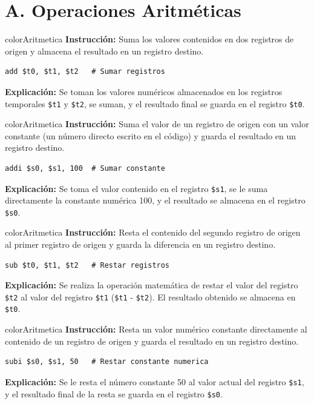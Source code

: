 \documentclass[12pt,a4paper]{article}
\begin{document}
\section*{\textcolor{colorAritmetica}{A. Operaciones Aritméticas}}

\begin{instructionBox}{colorAritmetica}
\textbf{Instrucción:} Suma los valores contenidos en dos registros de origen y almacena el resultado en un registro destino.
\begin{lstlisting}
add $t0, $t1, $t2   # Sumar registros
\end{lstlisting}
\textbf{Explicación:} Se toman los valores numéricos almacenados en los registros temporales \texttt{\$t1} y \texttt{\$t2}, se suman, y el resultado final se guarda en el registro \texttt{\$t0}.
\end{instructionBox}

\begin{instructionBox}{colorAritmetica}
\textbf{Instrucción:} Suma el valor de un registro de origen con un valor constante (un número directo escrito en el código) y guarda el resultado en un registro destino.
\begin{lstlisting}
addi $s0, $s1, 100  # Sumar constante
\end{lstlisting}
\textbf{Explicación:} Se toma el valor contenido en el registro \texttt{\$s1}, se le suma directamente la constante numérica 100, y el resultado se almacena en el registro \texttt{\$s0}.
\end{instructionBox}

\begin{instructionBox}{colorAritmetica}
\textbf{Instrucción:} Resta el contenido del segundo registro de origen al primer registro de origen y guarda la diferencia en un registro destino.
\begin{lstlisting}
sub $t0, $t1, $t2   # Restar registros
\end{lstlisting}
\textbf{Explicación:} Se realiza la operación matemática de restar el valor del registro \texttt{\$t2} al valor del registro \texttt{\$t1} (\texttt{\$t1} - \texttt{\$t2}). El resultado obtenido se almacena en \texttt{\$t0}.
\end{instructionBox}

\begin{instructionBox}{colorAritmetica}
\textbf{Instrucción:} Resta un valor numérico constante directamente al contenido de un registro de origen y guarda el resultado en un registro destino.
\begin{lstlisting}
subi $s0, $s1, 50   # Restar constante numerica
\end{lstlisting}
\textbf{Explicación:} Se le resta el número constante 50 al valor actual del registro \texttt{\$s1}, y el resultado final de la resta se guarda en el registro \texttt{\$s0}.
\end{instructionBox}
\end{document}
